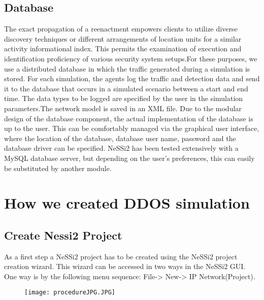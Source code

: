 \subsection{Database}
The exact propagation of a reenactment empowers clients to utilize diverse discovery techniques or different arrangements of location units for a similar activity informational index. This permits the examination of execution and identification proficiency of various security system setups.For these purposes, we use a distributed database in which the traffic generated during a simulation is stored. For each simulation, the agents log the traffic and detection data and send it to the database that occurs in a simulated scenario between a start and end time. The data types to be logged are specified by the user in the simulation parameters.The network model is saved in an XML file.
\newline
Due to the modular design of the database component, the actual implementation of the
database is up to the user. This can be comfortably managed via the graphical user interface, where the location of the database, database user name, password and the database driver can be specified. NeSSi2 has been tested extensively with a MySQL database server, but depending on the user’s preferences, this can easily be substituted by another module.

\section{How we created DDOS simulation}
\subsection{Create Nessi2 Project}
As a first step a NeSSi2 project has to be created using the NeSSi2 project creation
wizard. This wizard can be accessed in two ways in the NeSSi2 GUI. One way is by
the following menu sequence: File-> New-> IP Network(Project).

\begin{figure}[h]
	\centering
	\texttt{[image: procedureJPG.JPG]}
	\caption{}
	\label{fig:procedure}
\end{figure}

